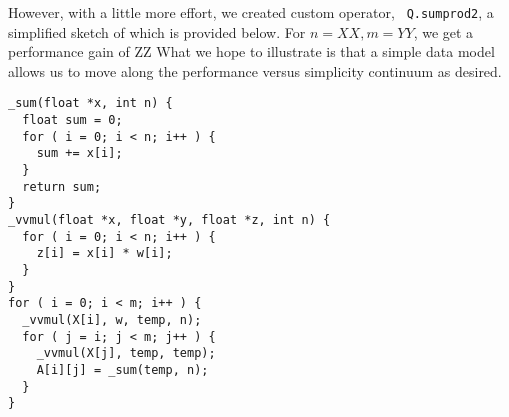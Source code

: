 However, with a little more effort, we created custom operator, {\tt
Q.sumprod2}, a simplified sketch of which is provided below. For \(n = XX, m =
YY\), we get a performance gain of ZZ \TBC What we hope to illustrate is that a
simple data model allows us to move along the performance versus simplicity
continuum as desired.
\begin{verbatim}
_sum(float *x, int n) {
  float sum = 0;
  for ( i = 0; i < n; i++ ) { 
    sum += x[i];
  }
  return sum;
}
_vvmul(float *x, float *y, float *z, int n) {
  for ( i = 0; i < n; i++ ) { 
    z[i] = x[i] * w[i];
  }
}
for ( i = 0; i < m; i++ ) { 
  _vvmul(X[i], w, temp, n);
  for ( j = i; j < m; j++ ) { 
    _vvmul(X[j], temp, temp);
    A[i][j] = _sum(temp, n);
  }
}
\end{verbatim}

